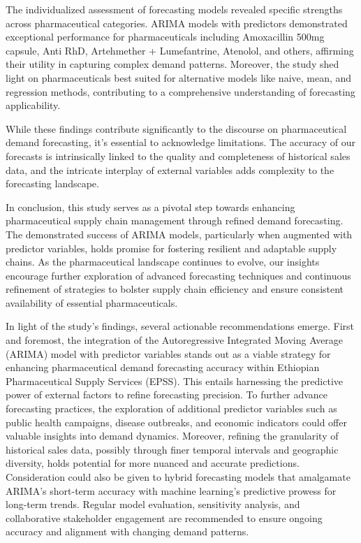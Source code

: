 \documentclass[
  authoryear,
  preprint,
  3p]{elsarticle}
\begin{document}
The individualized assessment of forecasting models revealed specific
strengths across pharmaceutical categories. ARIMA models with predictors
demonstrated exceptional performance for pharmaceuticals including
Amoxacillin 500mg capsule, Anti RhD, Artehmether + Lumefantrine,
Atenolol, and others, affirming their utility in capturing complex
demand patterns. Moreover, the study shed light on pharmaceuticals best
suited for alternative models like naive, mean, and regression methods,
contributing to a comprehensive understanding of forecasting
applicability.

While these findings contribute significantly to the discourse on
pharmaceutical demand forecasting, it's essential to acknowledge
limitations. The accuracy of our forecasts is intrinsically linked to
the quality and completeness of historical sales data, and the intricate
interplay of external variables adds complexity to the forecasting
landscape.

In conclusion, this study serves as a pivotal step towards enhancing
pharmaceutical supply chain management through refined demand
forecasting. The demonstrated success of ARIMA models, particularly when
augmented with predictor variables, holds promise for fostering
resilient and adaptable supply chains. As the pharmaceutical landscape
continues to evolve, our insights encourage further exploration of
advanced forecasting techniques and continuous refinement of strategies
to bolster supply chain efficiency and ensure consistent availability of
essential pharmaceuticals.

In light of the study's findings, several actionable recommendations
emerge. First and foremost, the integration of the Autoregressive
Integrated Moving Average (ARIMA) model with predictor variables stands
out as a viable strategy for enhancing pharmaceutical demand forecasting
accuracy within Ethiopian Pharmaceutical Supply Services (EPSS). This
entails harnessing the predictive power of external factors to refine
forecasting precision. To further advance forecasting practices, the
exploration of additional predictor variables such as public health
campaigns, disease outbreaks, and economic indicators could offer
valuable insights into demand dynamics. Moreover, refining the
granularity of historical sales data, possibly through finer temporal
intervals and geographic diversity, holds potential for more nuanced and
accurate predictions. Consideration could also be given to hybrid
forecasting models that amalgamate ARIMA's short-term accuracy with
machine learning's predictive prowess for long-term trends. Regular
model evaluation, sensitivity analysis, and collaborative stakeholder
engagement are recommended to ensure ongoing accuracy and alignment with
changing demand patterns.
\end{document}

